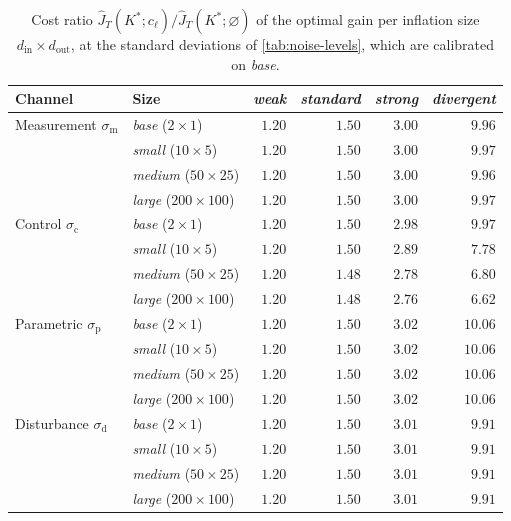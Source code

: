 \begin{table}[htbp]
\centering
\caption{Cost ratio $\hat{J}_T(K^{*}; c_{\ell}) / \hat{J}_T(K^{*}; \varnothing)$ of the optimal gain per inflation size $d_{\mathrm{in}} \times d_{\mathrm{out}}$, at the standard deviations of \cref{tab:noise-levels}, which are calibrated on \emph{base}.}
\label{tab:noise-size-ratios}
\begin{tabular}{@{}llrrrr@{}}
\toprule
Channel & Size & \emph{weak} & \emph{standard} & \emph{strong} & \emph{divergent} \\
\midrule
Measurement $\sigma_{\mathrm{m}}$ & \emph{base} ($2 \times 1$) & $1.20$ & $1.50$ & $3.00$ & $9.96$ \\
 & \emph{small} ($10 \times 5$) & $1.20$ & $1.50$ & $3.00$ & $9.97$ \\
 & \emph{medium} ($50 \times 25$) & $1.20$ & $1.50$ & $3.00$ & $9.96$ \\
 & \emph{large} ($200 \times 100$) & $1.20$ & $1.50$ & $3.00$ & $9.97$ \\
\midrule
Control $\sigma_{\mathrm{c}}$ & \emph{base} ($2 \times 1$) & $1.20$ & $1.50$ & $2.98$ & $9.97$ \\
 & \emph{small} ($10 \times 5$) & $1.20$ & $1.50$ & $2.89$ & $7.78$ \\
 & \emph{medium} ($50 \times 25$) & $1.20$ & $1.48$ & $2.78$ & $6.80$ \\
 & \emph{large} ($200 \times 100$) & $1.20$ & $1.48$ & $2.76$ & $6.62$ \\
\midrule
Parametric $\sigma_{\mathrm{p}}$ & \emph{base} ($2 \times 1$) & $1.20$ & $1.50$ & $3.02$ & $10.06$ \\
 & \emph{small} ($10 \times 5$) & $1.20$ & $1.50$ & $3.02$ & $10.06$ \\
 & \emph{medium} ($50 \times 25$) & $1.20$ & $1.50$ & $3.02$ & $10.06$ \\
 & \emph{large} ($200 \times 100$) & $1.20$ & $1.50$ & $3.02$ & $10.06$ \\
\midrule
Disturbance $\sigma_{\mathrm{d}}$ & \emph{base} ($2 \times 1$) & $1.20$ & $1.50$ & $3.01$ & $9.91$ \\
 & \emph{small} ($10 \times 5$) & $1.20$ & $1.50$ & $3.01$ & $9.91$ \\
 & \emph{medium} ($50 \times 25$) & $1.20$ & $1.50$ & $3.01$ & $9.91$ \\
 & \emph{large} ($200 \times 100$) & $1.20$ & $1.50$ & $3.01$ & $9.91$ \\
\bottomrule
\end{tabular}
\end{table}
